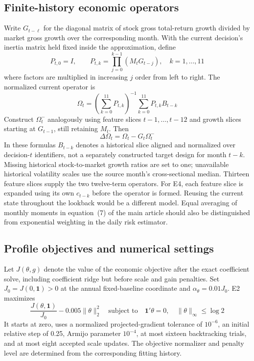 \documentclass[12pt,letterpaper,fleqn]{article}
\begin{document}
\subsection{Finite-history economic operators}
Write $G_{t-\ell}$ for the diagonal matrix of stock gross total-return growth divided by market gross growth over the corresponding month. With the current decision's inertia matrix held fixed inside the approximation, define
\begin{equation}
 P_{t,0}=I,\qquad
 P_{t,k}=\prod_{j=0}^{k-1}(M_tG_{t-j}),\quad k=1,\ldots,11
\end{equation}
where factors are multiplied in increasing $j$ order from left to right. The normalized current operator is
\begin{equation}
 \Omega_t=\left(\sum_{k=0}^{11}P_{t,k}\right)^{-1}
                 \sum_{k=0}^{11}P_{t,k}B_{t-k}
\end{equation}
Construct $\Omega_t^{-}$ analogously using feature slices $t-1,\ldots,t-12$ and growth slices starting at $G_{t-1}$, still retaining $M_t$. Then
\begin{equation}
 \Delta\Omega_t=\Omega_t-G_t\Omega_t^{-}
\end{equation}
In these formulas $B_{t-k}$ denotes a historical slice aligned and normalized over decision-$t$ identifiers, not a separately constructed target design for month $t-k$. Missing historical stock-to-market growth ratios are set to one; unavailable historical volatility scales use the source month's cross-sectional median. Thirteen feature slices supply the two twelve-term operators. For E4, each feature slice is expanded using its own $c_{t-k}$ before the operator is formed. Reusing the current state throughout the lookback would be a different model. Equal averaging of monthly moments in equation~(7) of the main article should also be distinguished from exponential weighting in the daily risk estimator.

\subsection{Profile objectives and numerical settings}
Let $J(\theta,g)$ denote the value of the economic objective after the exact coefficient solve, including coefficient ridge but before scale and gain penalties. Set $J_0=J(0,\mathbf 1)>0$ at the annual fixed-baseline coordinate and $\alpha_\theta=0.01J_0$. E2 maximizes
\begin{equation}
 \frac{J(\theta,\mathbf1)}{J_0}-0.005\|\theta\|_2^2
 \quad\text{subject to}\quad
 \mathbf1'\theta=0,\quad\|\theta\|_\infty\leq\log2
\end{equation}
It starts at zero, uses a normalized projected-gradient tolerance of $10^{-6}$, an initial relative step of 0.25, Armijo parameter $10^{-4}$, at most sixteen backtracking trials, and at most eight accepted scale updates. The objective normalizer and penalty level are determined from the corresponding fitting history.
\end{document}
